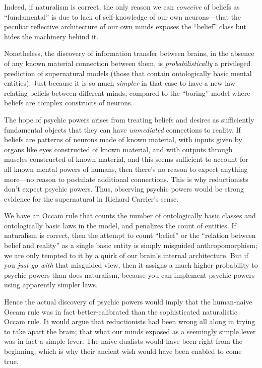 {
 Indeed, if naturalism is correct, the only reason we can
\textit{conceive} of beliefs as
``fundamental'' is due to lack of
self-knowledge of our own neurons---that the peculiar reflective
architecture of our own minds exposes the
``belief'' class but hides the
machinery behind it.}

{
 Nonetheless, the discovery of information transfer between brains,
in the absence of any known material connection between them, is
\textit{probabilistically} a privileged prediction of supernatural
models (those that contain ontologically basic mental entities). Just
because it is so much \textit{simpler} in that case to have a new law
relating beliefs between different minds, compared to the
``boring'' model where beliefs are
complex constructs of neurons.}

{
 The hope of psychic powers arises from treating beliefs and
desires as sufficiently fundamental objects that they can have
\textit{unmediated} connections to reality. If beliefs are patterns of
neurons made of known material, with inputs given by organs like eyes
constructed of known material, and with outputs through muscles
constructed of known material, and this seems sufficient to account for
all known mental powers of humans, then there's no
reason to expect anything more---no reason to postulate additional
connections. This is why reductionists don't expect
psychic powers. Thus, observing psychic powers would be strong evidence
for the supernatural in Richard Carrier's sense.}

{
 We have an Occam rule that counts the number of ontologically
basic classes and ontologically basic laws in the model, and penalizes
the count of entities. If naturalism is correct, then the attempt to
count ``belief'' or the
``relation between belief and
reality'' as a single basic entity is simply
misguided anthropomorphism; we are only tempted to it by a quirk of our
brain's internal architecture. But if you \textit{just
go with} that misguided view, then it assigns a much higher probability
to psychic powers than does naturalism, because you can implement
psychic powers using apparently simpler laws.}

{
 Hence the actual discovery of psychic powers would imply that the
human-naive Occam rule was in fact better-calibrated than the
sophisticated naturalistic Occam rule. It would argue that
reductionists had been wrong all along in trying to take apart the
brain; that what our minds exposed as a seemingly simple lever was in
fact a simple lever. The naive dualists would have been right from the
beginning, which is why their ancient wish would have been enabled to
come true.}


